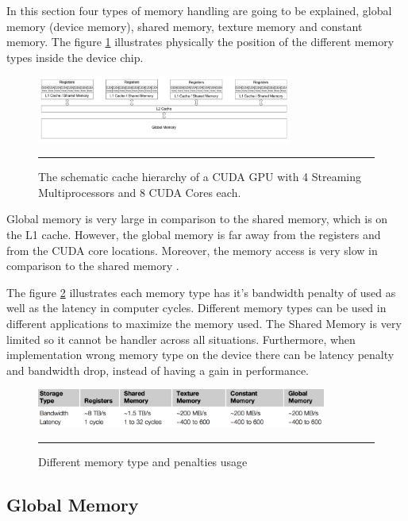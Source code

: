 In this section four types of memory handling are going to be explained,  global memory (device memory), shared memory, texture memory and constant memory. The figure \ref{fig:cores} illustrates physically the position of the different memory types inside the device chip.

\begin{figure}[htbp]
	\centering
		\includegraphics[width=0.75\textwidth]{Figures/cores.png}
		\rule{35em}{0.4pt}
	\caption[schematic cache hierarchy of a CUDA GPU]{The schematic cache hierarchy of a CUDA GPU with 4 Streaming Multiprocessors and 8 CUDA Cores each.}
	\label{fig:cores}
\end{figure}

Global memory is very large in comparison to the shared memory, which is on the L1 cache. However, the global memory is far away from the registers and from the CUDA core locations. Moreover, the memory access is very slow in comparison to the shared memory \cite{cook}.

The figure \ref{fig:memory} illustrates each memory type has it's bandwidth penalty of used as well as the latency in computer cycles. Different memory types can be used in different applications to maximize the memory used. The Shared Memory is very limited so it cannot be handler across all situations. Furthermore, when implementation wrong memory type on the device there can be latency penalty and bandwidth drop, instead of having a gain in performance.
 
\begin{figure}[htbp]
	\centering
		\includegraphics[width=0.85\textwidth]{Figures/memory.png}
		\rule{35em}{0.45pt}
	\caption[Different memory types]{Different memory type and penalties usage}
	\label{fig:memory}
\end{figure}

\subsection{Global Memory}

